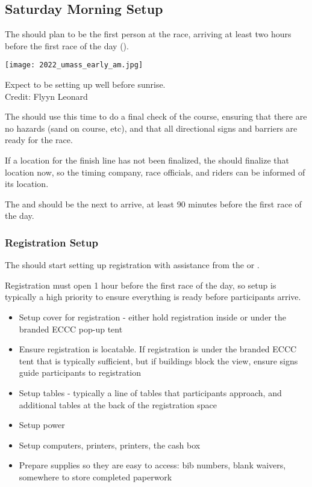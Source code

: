 \subsection{Saturday Morning Setup}

The  should plan to be the first person at the race, arriving at least two hours before the first race of the day
().

\begin{marginfigure}
  \texttt{[image: 2022\_umass\_early\_am.jpg]}
  \caption[Early morning race setup]{Expect to be setting up well before sunrise.\\
            Credit: Flyyn Leonard}
\end{marginfigure}

The  should use this time to do a final check of the course,
ensuring that there are no hazards (sand on course, etc),
and that all directional signs and barriers are ready for the race.

If a location for the finish line has not been finalized, the  should finalize that location now,
so the timing company, race officials, and riders can be informed of its location.

The  and  should be the next to arrive, at least 90 minutes before the first race of the day.

\subsubsection{Registration Setup}

The  should start setting up registration with assistance from the  or .

Registration must open 1 hour before the first race of the day, so setup is typically a high priority to ensure everything is ready before participants arrive.

\begin{itemize}
  \item Setup cover for registration - either hold registration inside or under the branded ECCC pop-up tent
  \item Ensure registration is locatable. If registration is under the branded ECCC tent that is typically sufficient, but if buildings block the view,
    ensure signs guide participants to registration
  \item Setup tables - typically a line of tables that participants approach, and additional tables at the back of the registration space
  \item Setup power
  \item Setup computers, printers, printers, the cash box
  \item Prepare supplies so they are easy to access: bib numbers, blank waivers, somewhere to store completed paperwork
\end{itemize}

